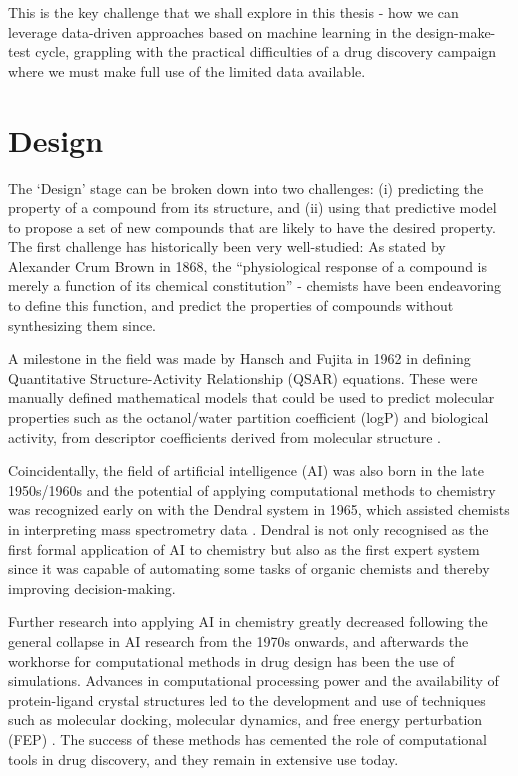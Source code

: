 This is the key challenge that we shall explore in this thesis - how we can leverage data-driven approaches based on machine learning in the design-make-test cycle, grappling with the practical difficulties of a drug discovery campaign where we must make full use of the limited data available.

\section*{Design}

The `Design' stage can be broken down into two challenges: (i) predicting the property of a compound from its structure, and (ii) using that predictive model to propose a set of new compounds that are likely to have the desired property. The first challenge has historically been very well-studied: As stated by Alexander Crum Brown in 1868, the ``physiological response of a compound is merely a function of its chemical constitution'' \cite{Brown1868} - chemists have been endeavoring to define this function, and predict the properties of compounds without synthesizing them since.

A milestone in the field was made by Hansch and Fujita in 1962 in defining Quantitative Structure-Activity Relationship (QSAR) equations. These were manually defined mathematical models that could be used to predict molecular properties such as the octanol/water partition coefficient (logP) and biological activity, from descriptor coefficients derived from molecular structure \cite{hansch1962correlation, hansch1964p}.

Coincidentally, the field of artificial intelligence (AI) was also born in the late 1950s/1960s and the potential of applying computational methods to chemistry was recognized early on with the Dendral system in 1965, which assisted chemists in interpreting mass spectrometry data \cite{Lindsay1993Dendral}. Dendral is not only recognised as the first formal application of AI to chemistry but also as the first expert system since it was capable of automating some tasks of organic chemists and thereby improving decision-making.

Further research into applying AI in chemistry greatly decreased following the general collapse in AI research from the 1970s onwards, and afterwards the workhorse for computational methods in drug design has been the use of simulations. Advances in computational processing power and the availability of protein-ligand crystal structures led to the development and use of techniques such as molecular docking, molecular dynamics, and free energy perturbation (FEP) \cite{Yu2017CADDMethods}. The success of these methods has cemented the role of computational tools in drug discovery, and they remain in extensive use today.

